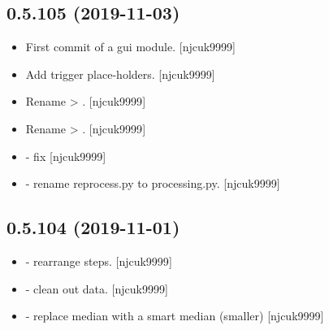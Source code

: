 \documentclass[a4paper,10pt,english]{report}
\begin{document}
\subsection{0.5.105 (2019-11-03)}
\label{\detokenize{misc/changelog:id37}}\begin{itemize}
\item {} 
First commit of a gui module. {[}njcuk9999{]}

\item {} 
Add trigger place-holders. {[}njcuk9999{]}

\item {} 
Rename  \textendash{}\textgreater{} . {[}njcuk9999{]}

\item {} 
Rename  \textendash{}\textgreater{} . {[}njcuk9999{]}

\item {} 
 - fix  {[}njcuk9999{]}

\item {} 
 - rename reprocess.py
to processing.py. {[}njcuk9999{]}

\end{itemize}


\subsection{0.5.104 (2019-11-01)}
\label{\detokenize{misc/changelog:id38}}\begin{itemize}
\item {} 
 - rearrange steps. {[}njcuk9999{]}

\item {} 
 - clean out data. {[}njcuk9999{]}

\item {} 
 - replace median with a smart median (smaller)
{[}njcuk9999{]}

\end{itemize}
\end{document}
